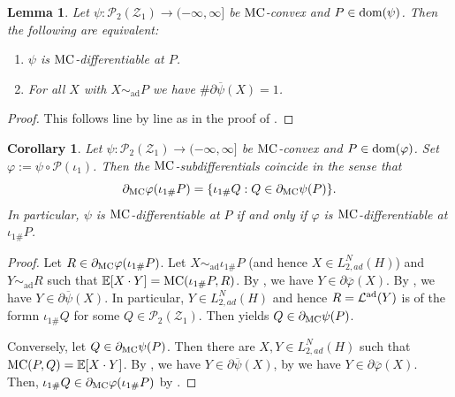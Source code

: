 \documentclass[a4paper]{amsart}
\numberwithin{theorem}{section}
\newtheorem{lemma}[theorem]{Lemma}
\newtheorem{corollary}[theorem]{Corollary}
\theoremstyle{definition}
\newcommand{\E}{\mathbb{E}}
\newcommand{\law}{\mathcal{L}}
\newcommand{\dom}{\textup{dom}}
\newcommand{\Pc}{\mathcal P}
\newcommand{\simad}{\sim_{\mathrm{ad}}}
\renewcommand{\phi}{\varphi}
\newcommand{\mc}{\textup{MC}}
\newcommand{\MC}{\textup{MC}}
\newcommand{\lawad}{\law^{\textup{ad}}}
\newcommand{\Zc}{\mathcal{Z}}
\begin{document}
\begin{lemma}\label{lem:mc_diff_char_FP}
    Let $\psi:\Pc_2(\Zc_1)\to (-\infty, \infty]$ be $\MC$-convex and $P\in \dom(\psi)$. Then the following are equivalent: 
    \begin{enumerate}
        \item $\psi$ is $\MC$-differentiable at $P$.
        \item For all $X$ with $X\simad P$ we have $\#\partial \overline \psi (X)=1$.
        
    \end{enumerate}
\end{lemma}
\begin{proof}
This follows line by line as in the proof of .
\end{proof}

\begin{corollary}\label{cor:dfb_ext_equiv}
Let $\psi:\Pc_2(\Zc_1)\to (-\infty, \infty]$ be $\MC$-convex and $P\in \dom(\phi)$. Set $\phi := \psi \circ \Pc(\iota_1)$. Then the $\mc$-subdifferentials coincide in the sense that 
\[
\partial_\mc\phi(\iota_{1\#}P) = \{ \iota_{1\#} Q : Q \in \partial_\mc\psi(P) \}.
\]
In particular, $\psi$ is $\mc$-differentiable at $P$ if and only if $\phi$ is $\mc$-differentiable at $\iota_{1\#}P$.  
\end{corollary}
\begin{proof}
Let $R \in \partial_\mc\phi(\iota_{1\#}P) $.  Let $X \simad \iota_{1\#}P$ (and hence $X \in L_{2,ad}^N(H)$) and $Y \simad R$ such that $\E [ X \cdot Y] = \mc(\iota_{1\#}P, R)$. By , we have  $Y \in \partial\overline{\phi}(X)$. By , we have $Y \in \partial \overline{\psi}(X)$. In particular, $Y \in L_{2,ad}^N(H)$ and hence $R = \lawad(Y)$ is of the formn $\iota_{1\#}Q$ for some $Q \in \Pc_2(\Zc_1)$. Then  yields $Q \in \partial_\mc\psi(P)$. 

Conversely, let $Q \in \partial_\mc\psi(P)$. Then there are $X,Y \in L_{2,ad}^N(H)$ such that $\mc(P,Q)=\E[X \cdot Y]$. By , we have $Y \in \partial\overline{\psi}(X)$, by  we have $Y \in \partial\overline{\phi}(X)$. Then, $\iota_{1\#} Q \in \partial_\mc\phi(\iota_{1\#}P)$ by . 
\end{proof}
\end{document}

